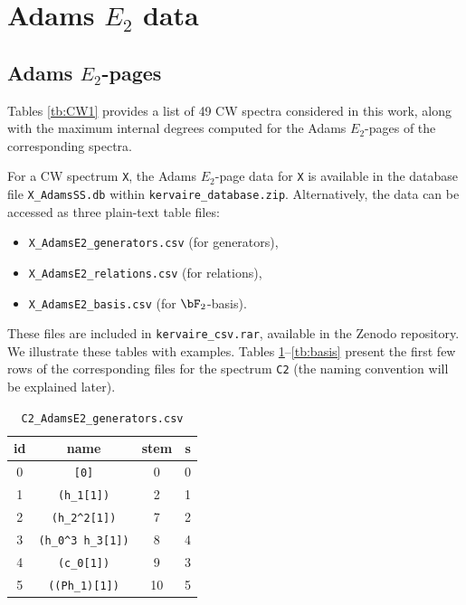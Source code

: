 \documentclass{amsart}
\numberwithin{equation}{section}
\begin{document}
\section{Adams $E_2$ data}\label{sec:E2}
\subsection{Adams $E_2$-pages}
Tables \ref{tb:CW1} provides a list of 49 CW spectra considered in this work, along with the maximum internal degrees computed for the Adams $E_2$-pages of the corresponding spectra.

\vspace{0.5cm}

For a CW spectrum \texttt{X}, the Adams $E_2$-page data for \texttt{X} is available in the database file \texttt{X\_AdamsSS.db} within \texttt{kervaire\_database.zip}. Alternatively, the data can be accessed as three plain-text table files:
\begin{itemize}
    \item \texttt{X\_AdamsE2\_generators.csv} (for generators),
    \item \texttt{X\_AdamsE2\_relations.csv} (for relations),
    \item \texttt{X\_AdamsE2\_basis.csv} (for $\bF_2$-basis).
\end{itemize}
These files are included in \texttt{kervaire\_csv.rar}, available in the Zenodo repository.
We illustrate these tables with examples. Tables \ref{tb:gen}--\ref{tb:basis} present the first few rows of the corresponding files for the spectrum \texttt{C2} (the naming convention will be explained later).

\begin{table}
\begin{tabular}{|c|c|c|c|}\hline
id & name & stem & s \\\hline
0 & \verb|[0]| & 0 & 0 \\\hline
1 & \verb|(h_1[1])| & 2 & 1 \\\hline
2 & \verb|(h_2^2[1])| & 7 & 2 \\\hline
3 & \verb|(h_0^3 h_3[1])| & 8 & 4 \\\hline
4 & \verb|(c_0[1])| & 9 & 3 \\\hline
5 & \verb|((Ph_1)[1])| & 10 & 5 \\\hline
\end{tabular}
\caption{\texttt{C2\_AdamsE2\_generators.csv}}\label{tb:gen}
\end{table}
\end{document}
